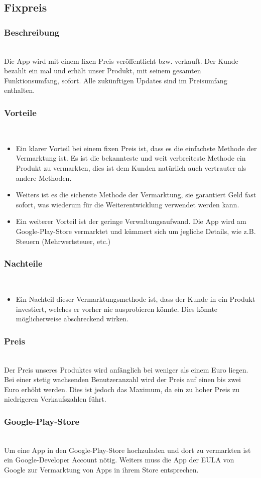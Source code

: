\documentclass[FIPLY_base.tex]{subfiles}
\begin{document}
	
\subsection{Fixpreis}

\subsubsection{Beschreibung}\ \\
Die App wird mit einem fixen Preis veröffentlicht bzw. verkauft.
Der Kunde bezahlt ein mal und erhält unser Produkt, mit seinem gesamten Funktionsumfang, sofort.
Alle zukünftigen Updates sind im Preisumfang enthalten.

\subsubsection{Vorteile}\ \\
\begin{itemize}

\item Ein klarer Vorteil bei einem fixen Preis ist, dass es die einfachste Methode der Vermarktung ist.
Es ist die bekannteste und weit verbreiteste Methode ein Produkt zu vermarkten, dies ist dem Kunden natürlich auch vertrauter als andere Methoden.

\item Weiters ist es die sicherste Methode der Vermarktung, sie garantiert Geld fast sofort, was wiederum für die Weiterentwicklung verwendet werden kann.

\item Ein weiterer Vorteil ist der geringe Verwaltungsaufwand. Die App wird am Google-Play-Store vermarktet
und kümmert sich um jegliche Details, wie z.B. Steuern (Mehrwertsteuer, etc.)

\end{itemize}

\subsubsection{Nachteile}\ \\
\begin{itemize}
\item Ein Nachteil dieser Vermarktungsmethode ist, dass der Kunde in ein Produkt investiert, welches er vorher nie ausprobieren könnte.
Dies könnte möglicherweise abschreckend wirken.
\end{itemize}

\subsubsection{Preis}\ \\
Der Preis unseres Produktes wird anfänglich bei weniger als einem Euro liegen.
Bei einer stetig wachsenden Benutzeranzahl wird der Preis auf einen bis zwei Euro erhöht werden.
Dies ist jedoch das Maximum, da ein zu hoher Preis zu niedrigeren Verkaufszahlen führt.

\subsubsection{Google-Play-Store}\ \\
Um eine App in den Google-Play-Store hochzuladen und dort zu vermarkten ist ein Google-Developer Account nötig.
Weiters muss die App der EULA von Google zur Vermarktung von Apps in ihrem Store entsprechen.
\end{document}
